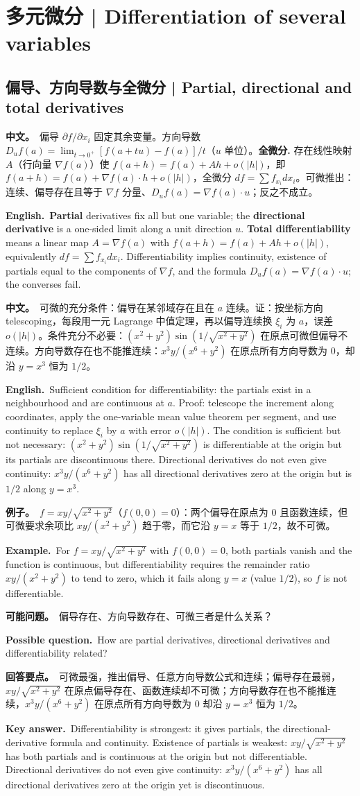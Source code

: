 \documentclass[UTF8,11pt,a4paper]{ctexart}
\newcommand{\BOTH}[2]{\par\noindent\textbf{中文。}\ #1\par\noindent\textbf{English.}\ #2\par}
\newcommand{\EX}[2]{\par\noindent\textbf{例子。}\ #1\par\noindent\textbf{Example.}\ #2\par}
\newcommand{\ASK}[4]{\begin{samepage}\par\noindent\textbf{可能问题。}\ #1\par\noindent\textbf{Possible question.}\ #2\par\noindent\textbf{回答要点。}\ #3\par\noindent\textbf{Key answer.}\ #4\medskip\end{samepage}}
\begin{document}
\section{多元微分 | Differentiation of several variables}

\subsection{偏导、方向导数与全微分 | Partial, directional and total derivatives}
\BOTH{偏导 $\partial f/\partial x_i$ 固定其余变量。方向导数 $D_uf(a)=\lim_{t\to0^+}[f(a+tu)-f(a)]/t$（$u$ 单位）。\textbf{全微分.} 存在线性映射 $A$（行向量 $\nabla f(a)$）使 $f(a+h)=f(a)+Ah+o(|h|)$，即 $f(a+h)=f(a)+\nabla f(a)\cdot h+o(|h|)$，全微分 $df=\sum f_{x_i}dx_i$。可微推出：连续、偏导存在且等于 $\nabla f$ 分量、$D_uf(a)=\nabla f(a)\cdot u$；反之不成立。}{\textbf{Partial} derivatives fix all but one variable; the \textbf{directional derivative} is a one-sided limit along a unit direction $u$. \textbf{Total differentiability} means a linear map $A=\nabla f(a)$ with $f(a+h)=f(a)+Ah+o(|h|)$, equivalently $df=\sum f_{x_i}dx_i$. Differentiability implies continuity, existence of partials equal to the components of $\nabla f$, and the formula $D_uf(a)=\nabla f(a)\cdot u$; the converses fail.}
\BOTH{可微的充分条件：偏导在某邻域存在且在 $a$ 连续。证：按坐标方向 telescoping，每段用一元 Lagrange 中值定理，再以偏导连续换 $\xi_i$ 为 $a$，误差 $o(|h|)$。条件充分不必要：$(x^2+y^2)\sin(1/\sqrt{x^2+y^2})$ 在原点可微但偏导不连续。方向导数存在也不能推连续：$x^3y/(x^6+y^2)$ 在原点所有方向导数为 $0$，却沿 $y=x^3$ 恒为 $1/2$。}{Sufficient condition for differentiability: the partials exist in a neighbourhood and are continuous at $a$. Proof: telescope the increment along coordinates, apply the one-variable mean value theorem per segment, and use continuity to replace $\xi_i$ by $a$ with error $o(|h|)$. The condition is sufficient but not necessary: $(x^2+y^2)\sin(1/\sqrt{x^2+y^2})$ is differentiable at the origin but its partials are discontinuous there. Directional derivatives do not even give continuity: $x^3y/(x^6+y^2)$ has all directional derivatives zero at the origin but is $1/2$ along $y=x^3$.}
\EX{$f=xy/\sqrt{x^2+y^2}$（$f(0,0)=0$）：两个偏导在原点为 $0$ 且函数连续，但可微要求余项比 $xy/(x^2+y^2)$ 趋于零，而它沿 $y=x$ 等于 $1/2$，故不可微。}{For $f=xy/\sqrt{x^2+y^2}$ with $f(0,0)=0$, both partials vanish and the function is continuous, but differentiability requires the remainder ratio $xy/(x^2+y^2)$ to tend to zero, which it fails along $y=x$ (value $1/2$), so $f$ is not differentiable.}
\ASK{偏导存在、方向导数存在、可微三者是什么关系？}{How are partial derivatives, directional derivatives and differentiability related?}{可微最强，推出偏导、任意方向导数公式和连续；偏导存在最弱，$xy/\sqrt{x^2+y^2}$ 在原点偏导存在、函数连续却不可微；方向导数存在也不能推连续，$x^3y/(x^6+y^2)$ 在原点所有方向导数为 $0$ 却沿 $y=x^3$ 恒为 $1/2$。}{Differentiability is strongest: it gives partials, the directional-derivative formula and continuity. Existence of partials is weakest: $xy/\sqrt{x^2+y^2}$ has both partials and is continuous at the origin but not differentiable. Directional derivatives do not even give continuity: $x^3y/(x^6+y^2)$ has all directional derivatives zero at the origin yet is discontinuous.}
\end{document}

